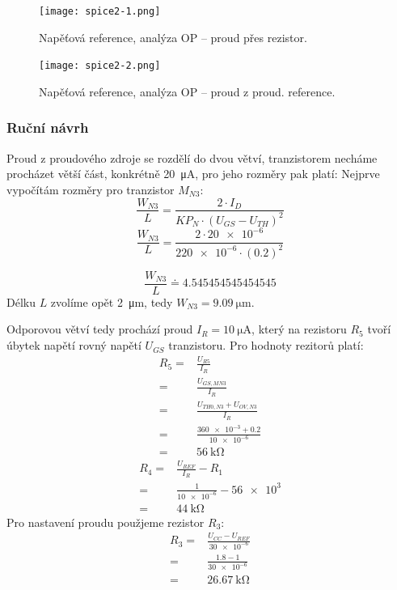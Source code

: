 \begin{figure}[h!]
    \centering
    \texttt{[image: spice2-1.png]}
    \caption{Napěťová reference, analýza OP -- proud přes rezistor.}
    \label{fig:spice0-png}
  \end{figure}

  \begin{figure}[h!]
    \centering
    \texttt{[image: spice2-2.png]}
    \caption{Napěťová reference, analýza OP -- proud z proud. reference.}
    \label{fig:spice0-png}
  \end{figure}


\clearpage
\subsubsection{Ruční návrh}
Proud z proudového zdroje se rozdělí do dvou větví, tranzistorem necháme procházet větší část, konkrétně \qty{20}{\micro\ampere}, pro jeho rozměry pak platí:
Nejprve vypočítám rozměry pro tranzistor \(M_{N3} \):
\[
    \frac{W_{N3} }{L}=\frac{2\cdot I_{D}}{KP_{N}\cdot (U_{GS} -U_{TH})^2 } 
\]
\[
    \frac{W_{N3} }{L}=\frac{2\cdot \num{20e-6}}{\num{220e-6}\cdot (\num{0.2})^2 } 
\]

\[
    \frac{W_{N3} }{L}\doteq \num[round-mode=places,round-precision=2]{4.545454545454545} 
\]
Délku \(L\) zvolíme opět \qty{2}{\micro\meter}, tedy \(W_{N3}= \qty{9.09}{\micro\meter}\). 

Odporovou větví tedy prochází proud \(I_{R} =\qty{10}{\micro\ampere}\), který na rezistoru \(R_{5} \) tvoří úbytek napětí rovný napětí \(U_{GS} \) tranzistoru. Pro hodnoty rezitorů platí:
\begin{align*}
    R_{5} =& \frac{U_{R5}}{I_{R}} \\
          =& \frac{U_{GS,MN3}}{I_{R}} \\
          =& \frac{U_{TH0,N3}+U_{OV,N3} }{I_{R}} \\
          =& \frac{\num{360e-3}+\num{0.2} }{\num{10e-6}} \\
          =& \qty{56}{\kilo\ohm}
\end{align*}
\begin{align*}
    R_{4} =& \frac{U_{REF}}{I_{R}} - R_{1}  \\
          =& \frac{1}{\num{10e-6}} - \num{56e3}  \\
          =& \qty{44}{\kilo\ohm}
\end{align*}
Pro nastavení proudu použjeme rezistor \(R_{3} \):
\begin{align*}
    R_{3} =& \frac{U_{CC} - U_{REF}}{\num{30e-6}}  \\
          =& \frac{\num{1.8} - 1}{\num{30e-6}}  \\
          =& \qty{26.67}{\kilo\ohm}
\end{align*}




